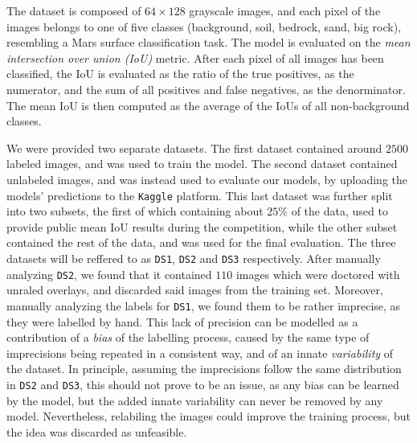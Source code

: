 \documentclass[11pt]{article}
\begin{document}
\begin{multicols}{2}

      The dataset is composed of $64\times128$ grayscale images, and each pixel of the images belongs to one of five classes (background, soil, bedrock, sand, big rock), resembling a Mars surface classification task\cite{li2024marssegmarssurfacesemantic}. The model is evaluated on the \textit{mean intersection over union (IoU)} metric. After each pixel of all images has been classified, the IoU is evaluated as the ratio of the true positives, as the numerator, and the sum of all positives and false negatives, as the denorminator. The mean IoU is then computed as the average of the IoUs of all non-background classes.

      We were provided two separate datasets. The first dataset contained around $2500$ labeled images, and was used to train the model. The second dataset contained unlabeled images, and was instead used to evaluate our models, by uploading the models' predictions to the \texttt{Kaggle}\cite{kaggle} platform. This last dataset was further split into two subsets, the first of which containing about $25\%$ of the data, used to provide public mean IoU results during the competition, while the other subset contained the rest of the data, and was used for the final evaluation. The three datasets will be reffered to as \texttt{DS1}, \texttt{DS2} and \texttt{DS3} respectively. After manually analyzing \texttt{DS2}, we found that it contained $110$ images which were doctored with unraled overlays, and discarded said images from the training set. Moreover, manually analyzing the labels for \texttt{DS1}, we found them to be rather imprecise, as they were labelled by hand. This lack of precision can be modelled as a contribution of a \textit{bias} of the labelling process, caused by the same type of imprecisions being repeated in a consistent way, and of an innate \textit{variability} of the dataset. In principle, assuming the imprecisions follow the same distribution in \texttt{DS2} and \texttt{DS3}, this should not prove to be an issue, as any bias can be learned by the model, but the added innate variability can never be removed by any model. Nevertheless, relabiling the images could improve the training process, but the idea was discarded as unfeasible.


\end{multicols}
\end{document}
